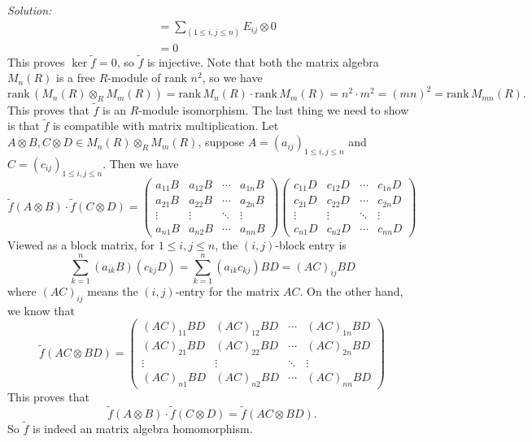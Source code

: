 \documentclass[a4paper, 12pt]{article}
\newenvironment{solution}
    {\textit{Solution:}}
    {}
\newcommand{\rank}{\text{rank}\,}
\begin{document}
\begin{solution}
\begin{align*}
		  &=\sum_(1\leq i,j\leq n)E_{ij}\otimes 0\\ 
		  &=0
\end{align*}
This proves \(\ker \tilde{f}=0\), so \(\tilde{f}\) is injective. Note that both the matrix algebra \(M_n(R)\) is a free \(R\)-module of rank \(n^2\), so we have 
\[\rank(M_n(R)\otimes_R M_m(R))=\rank M_n(R)\cdot \rank M_m(R)=n^2\cdot m^2=(mn)^2=\rank M_{mn}(R).\]
This proves that \(\tilde{f}\) is an \(R\)-module isomorphism. The last thing we need to show is that \(\tilde{f}\) is compatible with matrix multiplication. Let \(A\otimes B, C\otimes D\in M_n(R)\otimes_R M_m(R)\), suppose 
\(A=(a_{ij})_{1\leq i,j\leq n}\) and \(C=(c_{ij})_{1\leq i,j\leq n}\). Then we have 
\[\tilde{f}(A\otimes B)\cdot \tilde{f}(C\otimes D)=\begin{pmatrix}
	a_{11}B&a_{12}B&\cdots&a_{1n}B\\ 
		a_{21}B&a_{22}B&\cdots&a_{2n}B\\ 
		\vdots&\vdots&\ddots&\vdots\\ 
		a_{n1}B&a_{n2}B&\cdots&a_{nn}B
\end{pmatrix}\begin{pmatrix}
	c_{11}D&c_{12}D&\cdots&c_{1n}D\\ 
		c_{21}D&c_{22}D&\cdots&c_{2n}D\\ 
		\vdots&\vdots&\ddots&\vdots\\ 
		c_{n1}D&c_{n2}D&\cdots&c_{nn}D
\end{pmatrix}\]
Viewed as a block matrix, for \(1\leq i,j\leq n\), the \((i,j)\)-block entry is 
\[\sum_{k=1}^n (a_{ik}B)(c_{kj}D)=\sum_{k=1}^{n} (a_{ik}c_{kj})BD=(AC)_{ij}BD\]
where \((AC)_{ij}\) means the \((i,j)\)-entry for the matrix \(AC\). On the other hand, we know that 
\[\tilde{f}(AC\otimes BD)=\begin{pmatrix}
	(AC)_{11}BD&(AC)_{12}BD& \cdots&(AC)_{1n}BD\\ 
	(AC)_{21}BD&(AC)_{22}BD&\cdots&(AC)_{2n}BD\\ 
	\vdots&\vdots&\ddots&\vdots\\ 
	(AC)_{n1}BD&(AC)_{n2}BD&\cdots&(AC)_{nn}BD
\end{pmatrix}\]
This proves that 
\[\tilde{f}(A\otimes B)\cdot \tilde{f}(C\otimes D)=\tilde{f}(AC\otimes BD).\]
So \(\tilde{f}\) is indeed an matrix algebra homomorphism. 
\end{solution}
\end{document}
